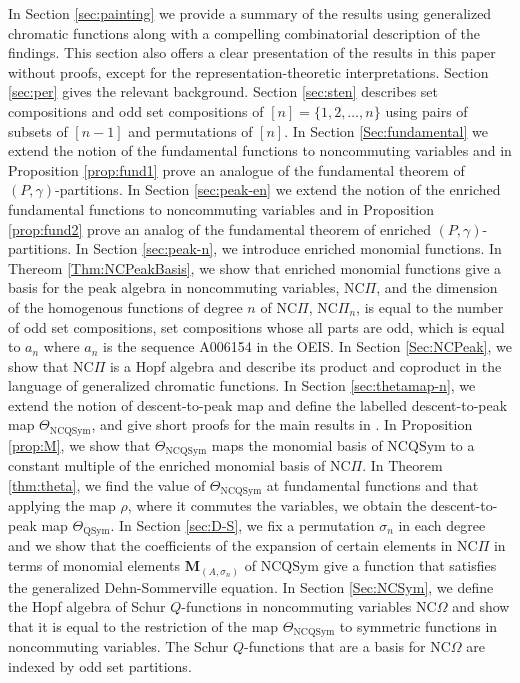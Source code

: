 \documentclass[11pt]{amsart}
\numberwithin{equation}{section}
\newcommand{\NCQSym}{\mathrm{NCQSym}}
\newcommand{\QSym}{\mathrm{QSym}}
\newcommand{\NCPeak}{\mathrm{NC}\Pi}
\newcommand{\NCGamma}{\mathrm{NC}\Omega}
\newcommand{\bfM}{{\mathbf{M}}}
\begin{document}
 In Section \ref{sec:painting} we provide a summary of the results using generalized chromatic functions along with a compelling combinatorial description of the findings. This section also offers a clear presentation of the results in this paper without proofs, except for the representation-theoretic interpretations. 
Section \ref{sec:per} gives the relevant background.
Section \ref{sec:sten} describes set compositions and odd set compositions of $[n]=\{1,2,\dots, n\}$ using pairs of subsets of $[n-1]$ and permutations of $[n]$. 
In Section \ref{Sec:fundamental} we extend the notion of the fundamental functions to noncommuting variables and in Proposition \ref{prop:fund1} prove an analogue of the fundamental theorem of $(P,\gamma)$-partitions. 
In Section \ref{sec:peak-en} we extend the notion of the enriched fundamental functions to noncommuting variables and in Proposition \ref{prop:fund2} prove an analog of the fundamental theorem of enriched $(P,\gamma)$-partitions. 
In Section \ref{sec:peak-n}, we introduce enriched monomial functions. In Thereom \ref{Thm:NCPeakBasis}, we show that enriched monomial functions give a basis for the peak algebra in noncommuting variables, $\NCPeak$, and the dimension of the homogenous functions of degree $n$ of $\NCPeak$, $\NCPeak_n$, is equal to the number of odd set compositions, set compositions whose all parts are odd, which is equal to $a_n$ where $a_n$ is the sequence A006154 in the OEIS. 
In Section \ref{Sec:NCPeak}, we show that $\NCPeak$ is a Hopf algebra and describe its product and coproduct in the language of generalized chromatic functions.
In Section \ref{sec:thetamap-n}, we extend the notion of descent-to-peak map and define the labelled descent-to-peak map $\Theta_{\NCQSym}$, and give short proofs for the main results in \cite{BMSvW}. In Proposition \ref{prop:M}, we show that $\Theta_{\NCQSym}$ maps the monomial basis of $\NCQSym$ to a constant multiple of the enriched monomial basis of $\NCPeak$. In Theorem \ref{thm:theta}, we find the value of $\Theta_{\NCQSym}$ at fundamental functions and that applying the map $\rho$, where it commutes the variables, we obtain the descent-to-peak map $\Theta_{\QSym}$.
  In Section \ref{sec:D-S},  we fix a permutation $\sigma_n$ in each degree and we show that the coefficients of the expansion of certain elements in $\NCPeak$ in terms of monomial elements $\bfM_{(A,\sigma_n)}$ of $\NCQSym$ give a function that satisfies the generalized Dehn-Sommerville equation. 
In Section \ref{Sec:NCSym}, we define the Hopf algebra of Schur $Q$-functions in noncommuting variables $\NCGamma$ and show that it is equal to the restriction of the map $\Theta_{\NCQSym}$ to symmetric functions in noncommuting variables. The Schur $Q$-functions that are a basis for $\NCGamma$ are indexed by odd set partitions.  
\end{document}

